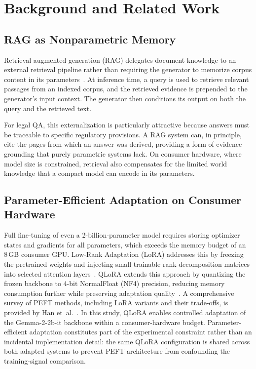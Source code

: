 \newpage
\section{Background and Related Work}

\subsection{RAG as Nonparametric Memory}

Retrieval-augmented generation (RAG) delegates document knowledge to an external retrieval pipeline rather than requiring the generator to memorize corpus content in its parameters~\cite{lewis2020rag}. At inference time, a query is used to retrieve relevant passages from an indexed corpus, and the retrieved evidence is prepended to the generator's input context. The generator then conditions its output on both the query and the retrieved text.

For legal QA, this externalization is particularly attractive because answers must be traceable to specific regulatory provisions. A RAG system can, in principle, cite the pages from which an answer was derived, providing a form of evidence grounding that purely parametric systems lack. On consumer hardware, where model size is constrained, retrieval also compensates for the limited world knowledge that a compact model can encode in its parameters.

\subsection{Parameter-Efficient Adaptation on Consumer Hardware}

Full fine-tuning of even a 2-billion-parameter model requires storing optimizer states and gradients for all parameters, which exceeds the memory budget of an 8\,GB consumer GPU. Low-Rank Adaptation (LoRA) addresses this by freezing the pretrained weights and injecting small trainable rank-decomposition matrices into selected attention layers~\cite{hu2022lora}. QLoRA extends this approach by quantizing the frozen backbone to 4-bit NormalFloat (NF4) precision, reducing memory consumption further while preserving adaptation quality~\cite{dettmers2023qlora}. A comprehensive survey of PEFT methods, including LoRA variants and their trade-offs, is provided by Han et~al.~\cite{han2024peft}. In this study, QLoRA enables controlled adaptation of the Gemma-2-2b-it backbone within a consumer-hardware budget. Parameter-efficient adaptation constitutes part of the experimental constraint rather than an incidental implementation detail: the same QLoRA configuration is shared across both adapted systems to prevent PEFT architecture from confounding the training-signal comparison.

